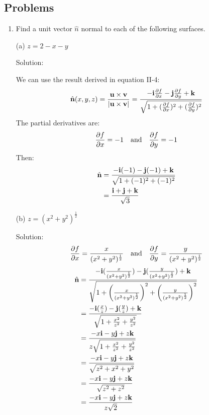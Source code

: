 \documentclass{article}
\begin{document}
\subsection*{Problems}
\begin{enumerate}
    \item Find a unit vector $\hat{n}$ normal to each of the following surfaces.

    (a) $z = 2 - x - y$

    Solution:

    We can use the result derived in equation II-4:
    \[ \hat{\textbf{n}}(x,y,z) = \frac{\textbf{u} \times \textbf{v}}{|\textbf{u} \times \textbf{v}|} = \frac{-\textbf{i}\frac{\partial{f}}{\partial{x}} -\textbf{j}\frac{\partial{f}}{\partial{y}} + \textbf{k}} {\sqrt{1 + (\frac{\partial{f}}{\partial{x}})^2 + (\frac{\partial{f}}{\partial{y}})^2 }} \]
    The partial derivatives are:
    \[ \frac{\partial{f}}{\partial{x}} = -1 \quad \textnormal{and} \quad \frac{\partial{f}}{\partial{y}} = -1 \]
    Then:
    \begin{align*}
        \hat{\textbf{n}} &= \frac{-\textbf{i}(-1) -\textbf{j}(-1) + \textbf{k}} {\sqrt{1 + (-1)^2 + (-1)^2 }} \\
        &= \frac{\textbf{i} + \textbf{j} + \textbf{k}}{\sqrt{3}}
    \end{align*}

    (b) $z = (x^2 + y^2)^\frac{1}{2}$

    Solution:
    \[ \frac{\partial{f}}{\partial{x}} = \frac{x}{(x^2 + y^2)^\frac{1}{2}} \quad \textnormal{and} \quad \frac{\partial{f}}{\partial{y}} = \frac{y}{(x^2 + y^2)^\frac{1}{2}} \]
    \begin{align*}
        \hat{\textbf{n}} &= \frac{-\textbf{i}(\frac{x}{{(x^2 + y^2)}^\frac{1}{2}}) -\textbf{j}(\frac{y}{(x^2 + y^2)^\frac{1}{2}}) + \textbf{k}} {\sqrt{1 + \left( \frac{x}{(x^2 + y^2)^\frac{1}{2}} \right)^2 + \left( \frac{y}{(x^2 + y^2)^\frac{1}{2}} \right)^2 }} \\
        &= \frac{-\textbf{i}(\frac{x}{z}) -\textbf{j}(\frac{y}{z}) + \textbf{k}} {\sqrt{1 + \frac{x^2}{z^2} + \frac{y^2}{z^2} }} \\
        &= \frac{-x\textbf{i} -y\textbf{j} + z\textbf{k}} {z\sqrt{1 + \frac{x^2}{z^2} + \frac{y^2}{z^2} }} \\
        &= \frac{-x\textbf{i} -y\textbf{j} + z\textbf{k}} {\sqrt{z^2 + x^2 + y^2}} \\
        &= \frac{-x\textbf{i} -y\textbf{j} + z\textbf{k}} {\sqrt{z^2 + z^2}} \\
        &= \frac{-x\textbf{i} -y\textbf{j} + z\textbf{k}} {z\sqrt{2}} \\
    \end{align*}


\end{enumerate}
\end{document}
